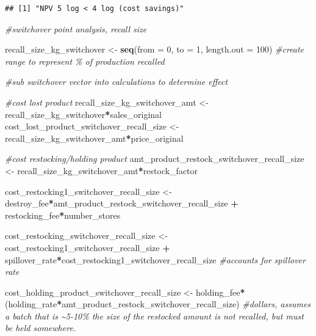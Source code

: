 \documentclass[
]{article}
\newenvironment{Shaded}{\begin{snugshade}}{\end{snugshade}}
\newcommand{\AttributeTok}[1]{\textcolor[rgb]{0.13,0.29,0.53}{#1}}
\newcommand{\CommentTok}[1]{\textcolor[rgb]{0.56,0.35,0.01}{\textit{#1}}}
\newcommand{\DecValTok}[1]{\textcolor[rgb]{0.00,0.00,0.81}{#1}}
\newcommand{\FunctionTok}[1]{\textcolor[rgb]{0.13,0.29,0.53}{\textbf{#1}}}
\newcommand{\NormalTok}[1]{#1}
\newcommand{\OtherTok}[1]{\textcolor[rgb]{0.56,0.35,0.01}{#1}}
\newcommand{\SpecialCharTok}[1]{\textcolor[rgb]{0.81,0.36,0.00}{\textbf{#1}}}
\begin{document}
\begin{verbatim}
## [1] "NPV 5 log < 4 log (cost savings)"
\end{verbatim}

\begin{Shaded}
\begin{Highlighting}[]
\CommentTok{\#switchover point analysis, recall size}

\NormalTok{recall\_size\_kg\_switchover }\OtherTok{\textless{}{-}} \FunctionTok{seq}\NormalTok{(}\AttributeTok{from =} \DecValTok{0}\NormalTok{, }\AttributeTok{to =} \DecValTok{1}\NormalTok{, }\AttributeTok{length.out =} \DecValTok{100}\NormalTok{) }\CommentTok{\#create range to represent \% of production recalled}

\CommentTok{\#sub switchover vector into calculations to determine effect}

\CommentTok{\#cost lost product}
\NormalTok{recall\_size\_kg\_switchover\_amt }\OtherTok{\textless{}{-}}\NormalTok{ recall\_size\_kg\_switchover}\SpecialCharTok{*}\NormalTok{sales\_original}
\NormalTok{cost\_lost\_product\_switchover\_recall\_size }\OtherTok{\textless{}{-}}\NormalTok{ recall\_size\_kg\_switchover\_amt}\SpecialCharTok{*}\NormalTok{price\_original }

\CommentTok{\#cost restocking/holding product}
\NormalTok{amt\_product\_restock\_switchover\_recall\_size }\OtherTok{\textless{}{-}}\NormalTok{ recall\_size\_kg\_switchover\_amt}\SpecialCharTok{*}\NormalTok{restock\_factor}

\NormalTok{cost\_restocking1\_switchover\_recall\_size }\OtherTok{\textless{}{-}}\NormalTok{ destroy\_fee}\SpecialCharTok{*}\NormalTok{amt\_product\_restock\_switchover\_recall\_size }\SpecialCharTok{+}\NormalTok{ restocking\_fee}\SpecialCharTok{*}\NormalTok{number\_stores  }

\NormalTok{cost\_restocking\_switchover\_recall\_size }\OtherTok{\textless{}{-}}\NormalTok{ cost\_restocking1\_switchover\_recall\_size }\SpecialCharTok{+}\NormalTok{ spillover\_rate}\SpecialCharTok{*}\NormalTok{cost\_restocking1\_switchover\_recall\_size }\CommentTok{\#accounts for spillover rate}

\NormalTok{cost\_holding\_product\_switchover\_recall\_size }\OtherTok{\textless{}{-}}\NormalTok{ holding\_fee}\SpecialCharTok{*}\NormalTok{(holding\_rate}\SpecialCharTok{*}\NormalTok{amt\_product\_restock\_switchover\_recall\_size) }\CommentTok{\#dollars, assumes a batch that is \textasciitilde{}5{-}10\% the size of the restocked amount is not recalled, but must be held somewhere.}


\end{Highlighting}
\end{Shaded}
\end{document}
